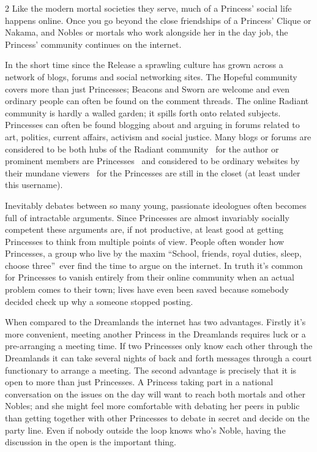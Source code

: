 \begin{multicols}{2}
Like the modern mortal societies they serve, much of a Princess' social life happens online. Once you go beyond the close friendships of a Princess' Clique or Nakama, and Nobles or mortals who work alongside her in the day job, the Princess' community continues on the internet. 

In the short time since the Release a sprawling culture has grown across a network of blogs, forums and social networking sites. The Hopeful community covers more than just Princesses; Beacons and Sworn are welcome and even ordinary people can often be found on the comment threads. The online Radiant community is hardly a walled garden; it spills forth onto related subjects. Princesses can often be found blogging about and arguing in forums related to art, politics, current affairs, activism and social justice. Many blogs or forums are considered to be both hubs of the Radiant community \textendash\, for the author or prominent members are Princesses \textendash\, and considered to be ordinary websites by their mundane viewers \textendash\, for the Princesses are still in the closet (at least under this username). 

Inevitably debates between so many young, passionate ideologues often becomes full of intractable arguments. Since Princesses are almost invariably socially competent these arguments are, if not productive, at least good at getting Princesses to think from multiple points of view. People often wonder how Princesses, a group who live by the maxim \textquotedblleft School, friends, royal duties, sleep, choose three\textquotedblright\, ever find the time to argue on the internet. In truth it's common for Princesses to vanish entirely from their online community when an actual problem comes to their town; lives have even been saved because somebody decided check up why a someone stopped posting. 

When compared to the Dreamlands the internet has two advantages. Firstly it's more convenient, meeting another Princess in the Dreamlands requires luck or a pre-arranging a meeting time. If two Princesses only know each other through the Dreamlands it can take several nights of back and forth messages through a court functionary to arrange a meeting. The second advantage is precisely that it is open to more than just Princesses. A Princess taking part in a national conversation on the issues on the day will want to reach both mortals and other Nobles; and she might feel more comfortable with debating her peers in public than getting together with other Princesses to debate in secret and decide on the party line. Even if nobody outside the loop knows who's Noble, having the discussion in the open is the important thing.


\end{multicols}

